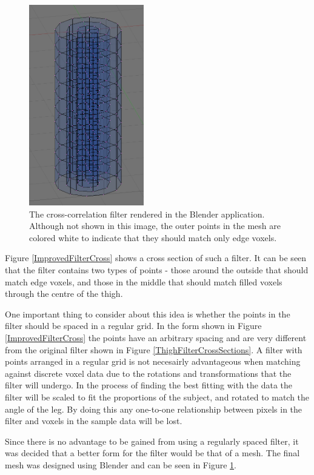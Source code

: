 \begin{figure}[tb]
	\centering
	\includegraphics[width=5cm]{thighmodel.png}
	\caption{The cross-correlation filter rendered in the Blender application.
		Although not shown in this image, the outer points in the mesh are colored white to indicate that they should
		match only edge voxels.}
	\label{ImprovedFilter}
\end{figure}

Figure \ref{ImprovedFilterCross} shows a cross section of such a filter.
It can be seen that the filter contains two types of points - those around the outside that should match edge voxels,
and those in the middle that should match filled voxels through the centre of the thigh.

One important thing to consider about this idea is whether the points in the filter should be spaced in a regular grid.
In the form shown in Figure \ref{ImprovedFilterCross} the points have an arbitrary spacing and are very different from the original filter shown in Figure \ref{ThighFilterCrossSections}.
A filter with points arranged in a regular grid is not necesairly advantageous when matching against discrete voxel data due to the rotations and transformations that the filter will undergo.
In the process of finding the best fitting with the data the filter will be scaled to fit the proportions of the subject, and rotated to match the angle of the leg.
By doing this any one-to-one relationship between pixels in the filter and voxels in the sample data will be lost.

Since there is no advantage to be gained from using a regularly spaced filter, it was decided that a better form for the filter would be that of a mesh.
The final mesh was designed using Blender \cite{Blender} and can be seen in Figure \ref{ImprovedFilter}.



